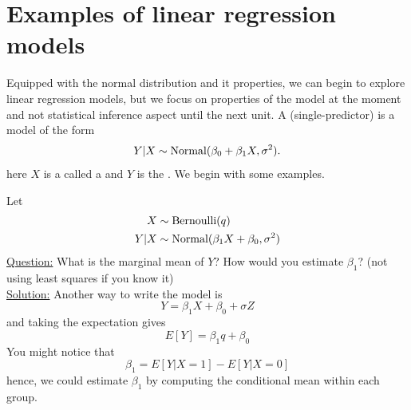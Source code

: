  \section{Examples of linear regression models}
Equipped with the normal distribution and it properties, we can begin to explore linear regression models, but we focus on properties of the model at the moment and not statistical inference aspect until the next unit. A (single-predictor)  is a model of the form 
\begin{equation}
Y|X \sim {\rm Normal}(\beta_0 + \beta_1 X,\sigma^2). 
\end{equation}
here $X$ is a called a  and $Y$ is the . We begin with some examples. 

 

 \begin{example}\label{ex:zerothreg}
 Let
\begin{align*}
X &\sim {\rm Bernoulli}(q)\\
Y|X &\sim {\rm Normal}(\beta_1X + \beta_0,\sigma^2)
\end{align*} \noindent
\underline{Question:} What is the marginal mean of $Y$? How would you estimate $\beta_1$? (not using least squares if you know it)  \\


 \noindent
\underline{Solution:} 
Another way to write the model is 
\begin{equation}
Y = \beta_1X + \beta_0 + \sigma Z
\end{equation}
and taking the expectation gives
\begin{equation}
E[Y] = \beta_1q + \beta_0
\end{equation}
You might notice that 
\begin{equation}
\beta_1 = E[Y|X=1]-E[Y|X=0]
\end{equation}
hence, we could estimate $\beta_1$ by computing the conditional mean within each group. 


 \end{example}

